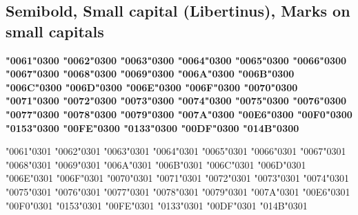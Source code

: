 \newpage
\subsection*{Semibold, Small capital (Libertinus), Marks on small capitals}

{\bfseries
\textsc{\char"0061\char"0300} \textsc{\char"0062\char"0300} \textsc{\char"0063\char"0300} \textsc{\char"0064\char"0300} \textsc{\char"0065\char"0300} \textsc{\char"0066\char"0300} \textsc{\char"0067\char"0300} \textsc{\char"0068\char"0300} \textsc{\char"0069\char"0300} \textsc{\char"006A\char"0300} \textsc{\char"006B\char"0300} \textsc{\char"006C\char"0300} \textsc{\char"006D\char"0300} \textsc{\char"006E\char"0300} \textsc{\char"006F\char"0300} \textsc{\char"0070\char"0300} \textsc{\char"0071\char"0300} \textsc{\char"0072\char"0300} \textsc{\char"0073\char"0300} \textsc{\char"0074\char"0300} \textsc{\char"0075\char"0300} \textsc{\char"0076\char"0300} \textsc{\char"0077\char"0300} \textsc{\char"0078\char"0300} \textsc{\char"0079\char"0300} \textsc{\char"007A\char"0300} \textsc{\char"00E6\char"0300} \textsc{\char"00F0\char"0300} \textsc{\char"0153\char"0300} \textsc{\char"00FE\char"0300} \textsc{\char"0133\char"0300} \textsc{\char"00DF\char"0300} \textsc{\char"014B\char"0300}

\textsc{\char"0061\char"0301} \textsc{\char"0062\char"0301} \textsc{\char"0063\char"0301} \textsc{\char"0064\char"0301} \textsc{\char"0065\char"0301} \textsc{\char"0066\char"0301} \textsc{\char"0067\char"0301} \textsc{\char"0068\char"0301} \textsc{\char"0069\char"0301} \textsc{\char"006A\char"0301} \textsc{\char"006B\char"0301} \textsc{\char"006C\char"0301} \textsc{\char"006D\char"0301} \textsc{\char"006E\char"0301} \textsc{\char"006F\char"0301} \textsc{\char"0070\char"0301} \textsc{\char"0071\char"0301} \textsc{\char"0072\char"0301} \textsc{\char"0073\char"0301} \textsc{\char"0074\char"0301} \textsc{\char"0075\char"0301} \textsc{\char"0076\char"0301} \textsc{\char"0077\char"0301} \textsc{\char"0078\char"0301} \textsc{\char"0079\char"0301} \textsc{\char"007A\char"0301} \textsc{\char"00E6\char"0301} \textsc{\char"00F0\char"0301} \textsc{\char"0153\char"0301} \textsc{\char"00FE\char"0301} \textsc{\char"0133\char"0301} \textsc{\char"00DF\char"0301} \textsc{\char"014B\char"0301}

}

